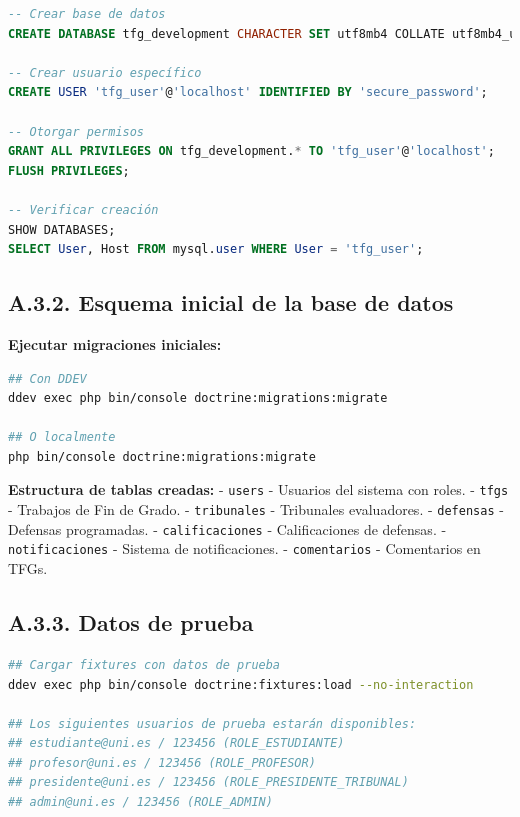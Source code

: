 \documentclass[12pt,a4paper,oneside]{report}
\providecommand{\passthrough}[1]{\texttt{#1}}
\begin{document}
{\begin{lstlisting}[language=SQL]
-- Crear base de datos
CREATE DATABASE tfg_development CHARACTER SET utf8mb4 COLLATE utf8mb4_unicode_ci;

-- Crear usuario específico
CREATE USER 'tfg_user'@'localhost' IDENTIFIED BY 'secure_password';

-- Otorgar permisos
GRANT ALL PRIVILEGES ON tfg_development.* TO 'tfg_user'@'localhost';
FLUSH PRIVILEGES;

-- Verificar creación
SHOW DATABASES;
SELECT User, Host FROM mysql.user WHERE User = 'tfg_user';
\end{lstlisting}

\subsection{A.3.2. Esquema inicial de la base de
datos}\label{a.3.2.-esquema-inicial-de-la-base-de-datos}

\textbf{Ejecutar migraciones iniciales:}

\begin{lstlisting}[language=bash]
## Con DDEV
ddev exec php bin/console doctrine:migrations:migrate

## O localmente
php bin/console doctrine:migrations:migrate
\end{lstlisting}

\textbf{Estructura de tablas creadas:} - \passthrough{\lstinline!users!}
- Usuarios del sistema con roles. - \passthrough{\lstinline!tfgs!} -
Trabajos de Fin de Grado. - \passthrough{\lstinline!tribunales!} -
Tribunales evaluadores. - \passthrough{\lstinline!defensas!} - Defensas
programadas. - \passthrough{\lstinline!calificaciones!} - Calificaciones
de defensas. - \passthrough{\lstinline!notificaciones!} - Sistema de
notificaciones. - \passthrough{\lstinline!comentarios!} - Comentarios en
TFGs.

\subsection{A.3.3. Datos de prueba}\label{a.3.3.-datos-de-prueba}

\begin{lstlisting}[language=bash]
## Cargar fixtures con datos de prueba
ddev exec php bin/console doctrine:fixtures:load --no-interaction

## Los siguientes usuarios de prueba estarán disponibles:
## estudiante@uni.es / 123456 (ROLE_ESTUDIANTE)
## profesor@uni.es / 123456 (ROLE_PROFESOR)
## presidente@uni.es / 123456 (ROLE_PRESIDENTE_TRIBUNAL)
## admin@uni.es / 123456 (ROLE_ADMIN)
\end{lstlisting}

}
\end{document}
